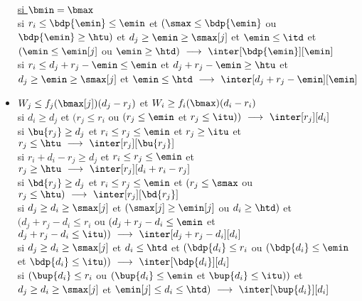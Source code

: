 \documentclass{report}
\begin{document}
\begin{itemize}
  \underline{si $\bmin=\bmax$}\\
  \vspace{0.2cm}
  si $r_i \le \bdp{\emin} \le \emin$ et 
  $(\smax \le \bdp{\emin}$ ou  $ \bdp{\emin} \ge \htu)$ et 
  $d_j \ge \emin \ge \smax[j]$ et   $\emin \le \itd$ et 
  $(\emin \le \emin[j]$ ou $\emin \ge \htd)\ \longrightarrow\ 
  \inter[\bdp{\emin}][\emin]$\\
  \vspace{0.1cm}
  si $r_i \le d_j+r_j-\emin \le \emin$ et $ d_j+r_j-\emin \ge \htu$ et 
  $d_j \ge \emin \ge \smax[j]$ et 
  $\emin\le \htd\ \longrightarrow\ \inter[d_j+r_j-\emin][\emin]$\\

  \vspace{0.5cm}


\item $W_j\le f_j(\bmax[j])(d_j-r_j)$ et $W_i \ge f_i(\bmax)(d_i-r_i)$\\
  \vspace{0.2cm}
  si $d_i \ge d_j$ et $(r_j \le r_i$ ou $(r_j \le \emin$ et $r_j \le \itu))\ 
  \longrightarrow\ \inter[r_j][d_i]$\\
  \vspace{0.1cm}
  si $\bu{r_j} \ge d_j$ et $r_i \le r_j \le \emin$ et $r_j \ge \itu$ et  $r_j \le \htu\ \longrightarrow\ 
  \inter[r_j][\bu{r_j}]$\\
  \vspace{0.1cm}
  si $r_i+d_i-r_j \ge d_j$ et $r_i \le r_j \le \emin$ et 
  $r_j\ge \htu\ \longrightarrow\ \inter[r_j][d_i+r_i-r_j]$\\
  \vspace{0.1cm}
  si $\bd{r_j} \ge d_j$ et $r_i \le r_j \le \emin$ et $(r_j \le \smax$ ou  $r_j \le \htu)\ \longrightarrow\ 
  \inter[r_j][\bd{r_j}]$\\
  \vspace{0.1cm}
  si $d_j \ge d_i \ge \smax[j]$ et $(\smax[j] \ge \emin[j]$ ou $d_i \ge \htd)$ et 
  $(d_j+r_j-d_i \le r_i$ ou $(d_j+r_j-d_i \le \emin$ et 
  $d_j+r_j-d_i \le \itu))\ 
  \longrightarrow\ \inter[d_j+r_j-d_i][d_i]$\\
  \vspace{0.1cm}
  si $d_j \ge d_i \ge \smax[j]$ et $ d_i \le \htd$ et $(\bdp{d_i} \le r_i$ ou $(\bdp{d_i} \le \emin$ et  
  $\bdp{d_i} \le \itu))\ \longrightarrow\ \inter[\bdp{d_i}][d_i]$\\
  \vspace{0.1cm}
  si $(\bup{d_i} \le r_i$ ou $(\bup{d_i} \le \emin$ et  
  $\bup{d_i} \le \itu))$ et $d_j \ge d_i \ge \smax[j]$ et $\emin[j]\le d_i \le \htd)\ \longrightarrow\ 
  \inter[\bup{d_i}][d_i]$\\
  \vspace{0.25cm}


\end{itemize}
\end{document}
